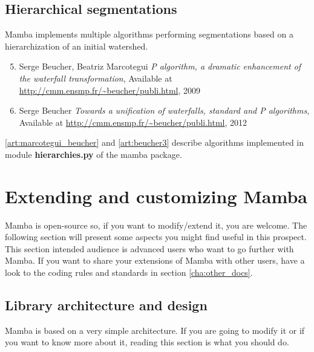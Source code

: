 \documentclass[a4paper,10pt,oneside]{article}
\begin{document}
\subsection{Hierarchical segmentations}
\label{cha:hierar_seg}

Mamba implements multiple algorithms performing segmentations based on
a hierarchization of an initial watershed.

\begin{enumerate}
\setcounter{enumi}{4}
\item \label{art:marcotegui_beucher} Serge Beucher, Beatriz Marcotegui
\emph{P algorithm, a dramatic enhancement of the waterfall transformation},
Available at \url{http://cmm.ensmp.fr/~beucher/publi.html}, 2009

\item \label{art:beucher3} Serge Beucher
\emph{Towards a unification of waterfalls, standard and P algorithms},
Available at \url{http://cmm.ensmp.fr/~beucher/publi.html}, 2012
\end{enumerate}

\ref{art:marcotegui_beucher} and \ref{art:beucher3} describe algorithms
implemented in module \textbf{hierarchies.py} of the mamba package.

\pagebreak

\section{Extending and customizing Mamba}

Mamba is open-source so, if you want to modify/extend it, you are welcome. The
following section will present some aspects you might find useful in this
prospect. This section intended audience is advanced users who want to go 
further with Mamba. If you want to share your extensions of Mamba with other users,
have a look to the coding rules and standards in section \ref{cha:other_docs}. 

\subsection{Library architecture and design}
\label{cha:lib_arch}

Mamba is based on a very simple architecture. If you are going to modify it or
if you want to know more about it, reading this section is what you should do.
\end{document}
